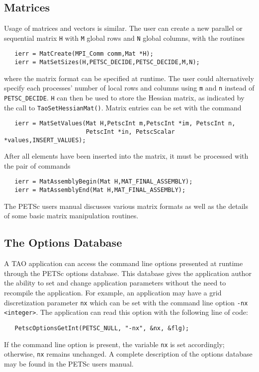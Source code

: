 \subsection*{Matrices}

Usage of matrices and vectors is similar.  
The user can create a new parallel or sequential matrix \texttt{H} with 
\texttt{M} global rows and \texttt{N} global columns, with the routines
\begin{verbatim}
   ierr = MatCreate(MPI_Comm comm,Mat *H);
   ierr = MatSetSizes(H,PETSC_DECIDE,PETSC_DECIDE,M,N);
\end{verbatim}
\noindent
where the matrix format can be specified at runtime.  The user could
alternatively specify each processes' number of local rows and columns
using \texttt{m} and \texttt{n} instead of \texttt{PETSC\_DECIDE}.  
\texttt{H} can then be used to store
the Hessian matrix, as indicated by the call to
\texttt{TaoSetHessianMat()}.  Matrix entries can be set with the
command
\begin{verbatim}
   ierr = MatSetValues(Mat H,PetscInt m,PetscInt *im, PetscInt n,
                       PetscInt *in, PetscScalar *values,INSERT_VALUES);
\end{verbatim}
\noindent
After %
all elements have been inserted into the
matrix, it must be processed with the pair of commands
\begin{verbatim}
   ierr = MatAssemblyBegin(Mat H,MAT_FINAL_ASSEMBLY);
   ierr = MatAssemblyEnd(Mat H,MAT_FINAL_ASSEMBLY);
\end{verbatim}
\noindent
The PETSc users manual discusses various matrix formats as
well as the details of some basic matrix manipulation routines.


\subsection*{The Options Database}
\label{sec:options}
A TAO application can access the command line options presented at
runtime through the PETSc options database. This database gives the application
author the ability to set and change application parameters without
the need to recompile the application. For example, 
an application may have a grid discretization parameter \texttt{nx}
which can be set with the command line option \texttt{-nx <integer>}.
The application can read this option with the following line of code:
\begin{verbatim}
   PetscOptionsGetInt(PETSC_NULL, "-nx", &nx, &flg);
\end{verbatim}
\noindent
If the command line option is present, the variable \texttt{nx} is set
accordingly; otherwise, \texttt{nx} remains unchanged. A complete
description of the options database may be found in the PETSc users
manual.

